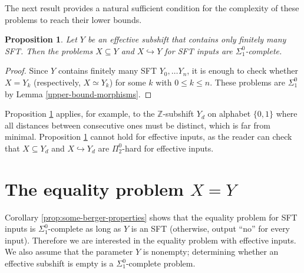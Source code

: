 \documentclass[a4paper]{article}
\newcommand{\Z}{\mathbb{Z}}
\newtheorem{proposition}[theorem]{Proposition}
\theoremstyle{definition}
\begin{document}
The next result provides a natural sufficient condition for the complexity of these problems to reach their lower bounds.

\begin{proposition}\label{thm:embed-lower}
    Let $Y$ be an effective subshift that contains only finitely many SFT. Then the problems $X\subseteq Y$ and $X\hookrightarrow Y$ for SFT inputs are $\Sigma^0_1$-complete.
\end{proposition}

\begin{proof}
Since $Y$ contains finitely many SFT $Y_0,\dots Y_n$, it is enough to check whether $X = Y_k$ (respectively,  $X \simeq Y_k$) for some $k$ with $0\leq k\leq n$. These problems are $\Sigma^0_1$ by Lemma \ref{upper-bound-morphisms}.
\end{proof}

Proposition \ref{thm:embed-lower} applies, for example, to the $\Z$-subshift $Y_d$ on alphabet $\{0,1\}$ where all distances between consecutive ones must be distinct, which is far from minimal. Proposition \ref{thm:embed-lower} cannot hold for effective inputs, as the reader can check that $X\subseteq Y_d$ and $X\hookrightarrow Y_d$ are $\Pi^0_2$-hard for effective inputs.



\section{The equality problem $X=Y$}\label{sec:equality}

Corollary \ref{prop:some-berger-properties} shows that the equality problem for SFT inputs is $\Sigma_1^0$-complete as long as $Y$ is an SFT (otherwise, output ``no'' for every input). Therefore we are interested in the equality problem with effective inputs. We also assume that the parameter $Y$ is nonempty; determining whether an effective subshift is empty is a $\Sigma_1^0$-complete problem.  
\end{document}
